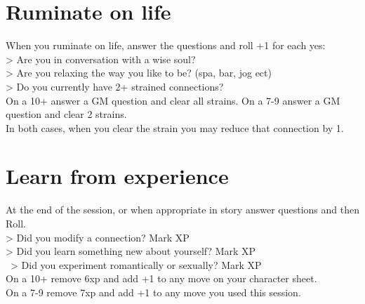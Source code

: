 \documentclass[letterpaper]{twentysecondcv} %
\begin{document}
\section{Ruminate on life}
When you ruminate on life, answer the questions and roll +1 for each yes:\\
> Are you in conversation with a wise soul?\\
> Are you relaxing the way you like to be? (spa, bar, jog ect)\\
> Do you currently have 2+ strained connections?\\
On a 10+ answer a GM question and clear all strains. On a 7-9 answer a GM question and clear 2 strains.\\
In both cases, when you clear the strain you may reduce that connection by 1.\\

\section{Learn from experience}
At the end of the session, or when appropriate in story answer questions and then Roll.\\
> Did you modify a connection? Mark XP\\
> Did you learn something new about yourself? Mark XP\\\
> Did you experiment romantically or sexually? Mark XP\\
On a 10+ remove 6xp and add +1 to any move on your character sheet.\\
On a 7-9 remove 7xp and add +1 to any move  you used this session.\\


\end{document}
